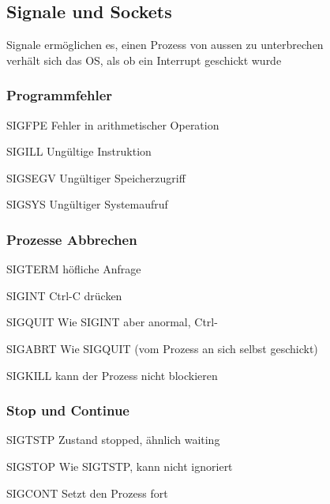 \begin{multicols*}{5}
\vspace{-5pt}






\section{Signale und Sockets}
	Signale ermöglichen es, einen Prozess von aussen zu unterbrechen\\
	verhält sich das OS, als ob ein Interrupt geschickt wurde


	\subsubsection{Programmfehler}
	\begin{compactitem}[$\bullet$]
		\item \textcolor{h}{SIGFPE} Fehler in arithmetischer Operation
		\item \textcolor{h}{SIGILL} Ungültige Instruktion 
		\item \textcolor{h}{SIGSEGV} Ungültiger Speicherzugriff
		\item \textcolor{h}{SIGSYS} Ungültiger Systemaufruf
	\end{compactitem}

	\subsubsection{Prozesse Abbrechen}
	\begin{compactitem}[$\bullet$]
		\item \textcolor{h}{SIGTERM} höfliche Anfrage
		\item \textcolor{h}{SIGINT} Ctrl-C drücken
		\item \textcolor{h}{SIGQUIT} Wie SIGINT aber anormal, Ctrl-\ 
		\item \textcolor{h}{SIGABRT} Wie SIGQUIT (vom Prozess an sich selbst geschickt)
		\item \textcolor{h}{SIGKILL} kann der Prozess nicht blockieren
	\end{compactitem}


	\subsubsection{Stop und Continue}
	\begin{compactitem}[$\bullet$]
		\item \textcolor{h}{SIGTSTP} Zustand stopped, ähnlich waiting
		\item \textcolor{h}{SIGSTOP} Wie SIGTSTP, kann nicht ignoriert
		\item \textcolor{h}{SIGCONT} Setzt den Prozess fort
	\end{compactitem}


\end{multicols*}
